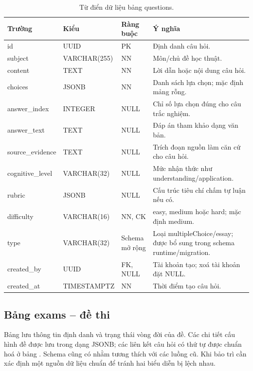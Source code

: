 \begin{table}[H]
\centering
\caption{Từ điển dữ liệu bảng questions.}
\label{tab:dict-questions}
\begin{tabularx}{\textwidth}{>{\ttfamily\color{daumaroon}}p{}p{}p{}X}
\toprule
\rowcolor{gray100}Trường & Kiểu & Ràng buộc & Ý nghĩa \\
\midrule
id & UUID & PK & Định danh câu hỏi. \\
subject & VARCHAR(255) & NN & Môn/chủ đề học thuật. \\
content & TEXT & NN & Lời dẫn hoặc nội dung câu hỏi. \\
choices & JSONB & NN & Danh sách lựa chọn; mặc định mảng rỗng. \\
answer\_index & INTEGER & NULL & Chỉ số lựa chọn đúng cho câu trắc nghiệm. \\
answer\_text & TEXT & NULL & Đáp án tham khảo dạng văn bản. \\
source\_evidence & TEXT & NULL & Trích đoạn nguồn làm căn cứ cho câu hỏi. \\
cognitive\_level & VARCHAR(32) & NULL & Mức nhận thức như understanding/application. \\
rubric & JSONB & NULL & Cấu trúc tiêu chí chấm tự luận nếu có. \\
difficulty & VARCHAR(16) & NN, CK & easy, medium hoặc hard; mặc định medium. \\
type & VARCHAR(32) & Schema mở rộng & Loại multipleChoice/essay; được bổ sung trong schema runtime/migration. \\
created\_by & UUID & FK, NULL & Tài khoản tạo; xoá tài khoản đặt NULL. \\
created\_at & TIMESTAMPTZ & NN & Thời điểm tạo câu hỏi. \\
\bottomrule
\end{tabularx}
\end{table}

\subsection{Bảng exams -- đề thi}
Bảng  lưu thông tin định danh và trạng thái vòng đời của đề.
Các chi tiết cấu hình đề được lưu trong  dạng JSONB; các
liên kết câu hỏi có thứ tự được chuẩn hoá ở bảng .
Schema cũng có  nhằm tương thích với các luồng cũ.
Khi bảo trì cần xác định một nguồn dữ liệu chuẩn để tránh hai biểu diễn
bị lệch nhau.

